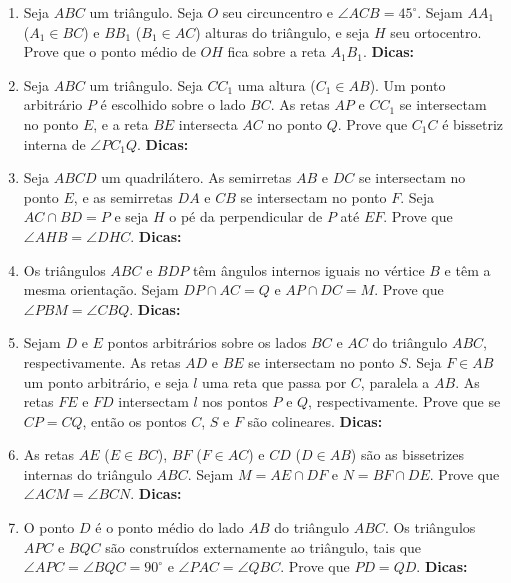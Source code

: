 \documentclass{article}
\newcommand{\dica}{\textbf{Dicas:}}
\newcommand{\iniTri}{Seja $ABC$ um triângulo}
\begin{document}
\begin{multicols}{2}
\begin{enumerate}
    \item \iniTri. Seja $O$ seu circuncentro e $\angle ACB=45^{\circ}$. Sejam $AA_1$ ($A_1\in BC$) e $BB_1$ ($B_1\in AC$) alturas do triângulo, e seja $H$ seu ortocentro. Prove que o ponto médio de $OH$ fica sobre a reta $A_1B_1$. \dica %
    
    \item \iniTri. Seja $CC_1$ uma altura ($C_1\in AB$). Um ponto arbitrário $P$ é escolhido sobre o lado $BC$. As retas $AP$ e $CC_1$ se intersectam no ponto $E$, e a reta $BE$ intersecta $AC$ no ponto $Q$. Prove que $C_1C$ é bissetriz interna de $\angle PC_1Q$. \dica %
    
    \item Seja $ABCD$ um quadrilátero. As semirretas $AB$ e $DC$ se intersectam no ponto $E$, e as semirretas $DA$ e $CB$ se intersectam no ponto $F$. Seja $AC\cap BD=P$ e seja $H$ o pé da perpendicular de $P$ até $EF$. Prove que $\angle AHB=\angle DHC$. \dica %
    
    \item Os triângulos $ABC$ e $BDP$ têm ângulos internos iguais no vértice $B$ e têm a mesma orientação. Sejam $DP\cap AC=Q$ e $AP\cap DC=M$. Prove que $\angle PBM=\angle CBQ$. \dica %
    
    \item Sejam $D$ e $E$ pontos arbitrários sobre os lados $BC$ e $AC$ do triângulo $ABC$, respectivamente. As retas $AD$ e $BE$ se intersectam no ponto $S$. Seja $F\in AB$ um ponto arbitrário, e seja $l$ uma reta que passa por $C$, paralela a $AB$. As retas $FE$ e $FD$ intersectam $l$ nos pontos $P$ e $Q$, respectivamente. Prove que se $CP=CQ$, então os pontos $C$, $S$ e $F$ são colineares. \dica %
    
    \item As retas $AE$ ($E\in BC$), $BF$ ($F\in AC$) e $CD$ ($D\in AB$) são as bissetrizes internas do triângulo $ABC$. Sejam $M=AE\cap DF$ e $N=BF\cap DE$. Prove que $\angle ACM=\angle BCN$. \dica %
    
    \item O ponto $D$ é o ponto médio do lado $AB$ do triângulo $ABC$. Os triângulos $APC$ e $BQC$ são construídos externamente ao triângulo, tais que $\angle APC=\angle BQC=90^{\circ}$ e $\angle PAC=\angle QBC$. Prove que $PD=QD$. \dica %
    

\end{enumerate}
\end{multicols}
\end{document}
